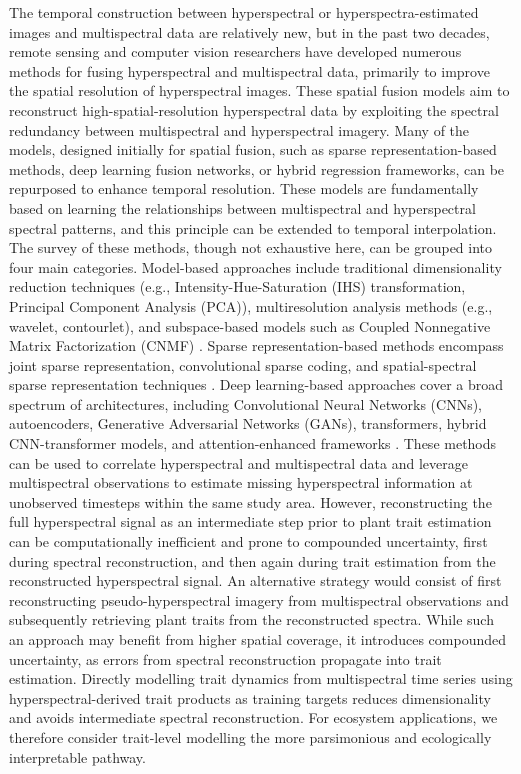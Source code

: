 \documentclass[pdflatex,sn-mathphys-num]{sn-jnl}%
\theoremstyle{thmstyleone}%
\theoremstyle{thmstyletwo}%
\theoremstyle{thmstylethree}%
\begin{document}
The temporal construction between hyperspectral or hyperspectra-estimated images and multispectral data are relatively new, but in the past two decades, remote sensing and computer vision researchers have developed numerous methods for fusing hyperspectral and multispectral data, primarily to improve the spatial resolution \cite{yokoya2017hyperspectral} of hyperspectral images. These spatial fusion models aim to reconstruct high-spatial-resolution hyperspectral data by exploiting the spectral redundancy between multispectral and hyperspectral imagery. Many of the models, designed initially for spatial fusion, such as sparse representation-based methods, deep learning fusion networks, or hybrid regression frameworks, can be repurposed to enhance temporal resolution. These models are fundamentally based on learning the relationships between multispectral and hyperspectral spectral patterns, and this principle can be extended to temporal interpolation. The survey of these methods, though not exhaustive here, can be grouped into four main categories. Model-based approaches include traditional dimensionality reduction techniques (e.g., Intensity-Hue-Saturation (IHS) transformation, Principal Component Analysis (PCA)), multiresolution analysis methods (e.g., wavelet, contourlet), and subspace-based models such as Coupled Nonnegative Matrix Factorization (CNMF) \cite{yokoya2017hyperspectral}. Sparse representation-based methods encompass joint sparse representation, convolutional sparse coding, and spatial-spectral sparse representation techniques \cite{xing2022fusion,dian2019multispectral}. Deep learning-based approaches cover a broad spectrum of architectures, including Convolutional Neural Networks (CNNs), autoencoders, Generative Adversarial Networks (GANs), transformers, hybrid CNN-transformer models, and attention-enhanced frameworks \cite{khader2022model,gao2023enhanced,jia2023multiscale,hong2021interpretable}. These methods can be used to correlate hyperspectral and multispectral data and leverage multispectral observations to estimate missing hyperspectral information at unobserved timesteps within the same study area. However, reconstructing the full hyperspectral signal as an intermediate step prior to plant trait estimation can be computationally inefficient and prone to compounded uncertainty, first during spectral reconstruction, and then again during trait estimation from the reconstructed hyperspectral signal. An alternative strategy would consist of first reconstructing pseudo-hyperspectral imagery from multispectral observations and subsequently retrieving plant traits from the reconstructed spectra. While such an approach may benefit from higher spatial coverage, it introduces compounded uncertainty, as errors from spectral reconstruction propagate into trait estimation. Directly modelling trait dynamics from multispectral time series using hyperspectral-derived trait products as training targets reduces dimensionality and avoids intermediate spectral reconstruction. For ecosystem applications, we therefore consider trait-level modelling the more parsimonious and ecologically interpretable pathway.
\end{document}
